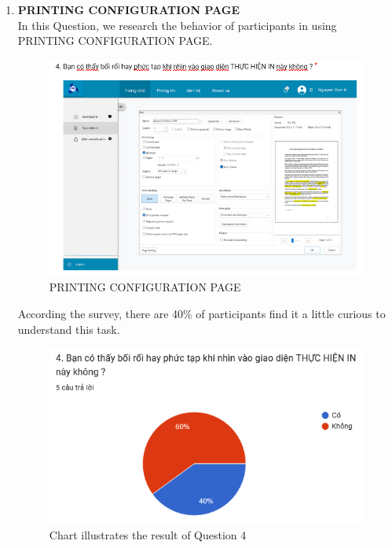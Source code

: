 \documentclass[a4paper]{report}
\begin{document}
\begin{enumerate}
    \item \textbf{PRINTING CONFIGURATION PAGE} \\
    In this Question, we research the behavior of participants in using PRINTING CONFIGURATION PAGE.
\begin{figure}[!h]
    \centering
    \includegraphics[width=0.8\linewidth]{images/image_uasbility/Q4_Stu.png}
    \caption{PRINTING CONFIGURATION PAGE}
    \label{fig:PRINTING CONFIGURATION PAGE}
\end{figure}
\newpage
According the survey, there are 40\% of participants find it a little curious to understand this task.
\begin{figure}[!h]
    \centering
    \includegraphics[width=0.8\linewidth]{images/image_uasbility/A4_Stu.png}
    \caption{Chart illustrates the result of Question 4}
    \label{fig:Chart illustrates the result of Question 4}
\end{figure}


\end{enumerate}
\end{document}
